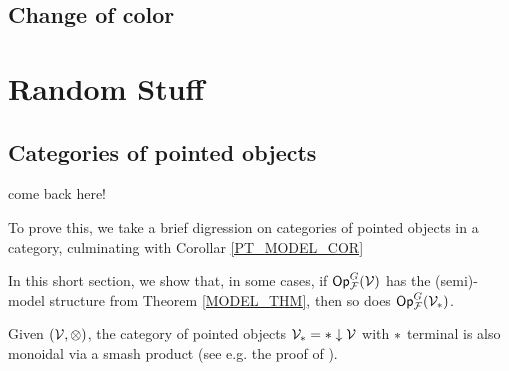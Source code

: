 \documentclass[a4paper,10pt
,draft
]{article}%
\renewcommand{\F}{\mathcal F}
\renewcommand{\1}{\eta}%
\begin{document}


\subsection{Change of color}




\section{Random Stuff}

\subsection{Categories of pointed objects}
\label{PT_SEC}
come back here!

To prove this, we take a brief digression on categories of pointed objects in a category,
culminating with Corollar \ref{PT_MODEL_COR}

In this short section, we show that, in some cases,
if $\Op^G_\F(\V)$ has the (semi)-model structure from Theorem \ref{MODEL_THM}, then so does $\Op^G_\F(\V_{\**})$.


Given $(\mathcal V, \otimes)$, the category of pointed objects $\V_{\**} = \** \downarrow \V$ with $\**$ terminal
is also monoidal via a smash product (see e.g. the proof of \cite[Prop. 4.2.9]{Hov99}).
\end{document}
